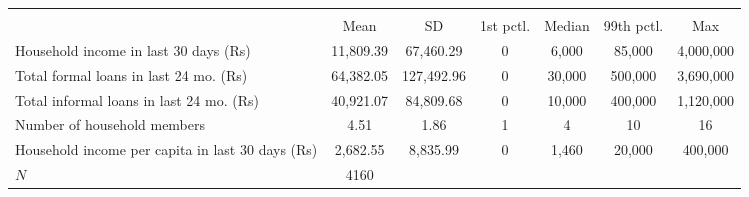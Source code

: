 {
\def\sym#1{\ifmmode^{#1}\else\(^{#1}\)\fi}
\begin{tabular}{l*{1}{cccccc}}
\hline\hline
            &\multicolumn{6}{c}{}                                                         \\
            &        Mean&          SD&   1st pctl.&      Median&  99th pctl.&         Max\\
\hline
Household income in last 30 days (Rs)&   11,809.39&   67,460.29&           0&       6,000&      85,000&   4,000,000\\
Total formal loans in last 24 mo. (Rs)&   64,382.05&  127,492.96&           0&      30,000&     500,000&   3,690,000\\
Total informal loans in last 24 mo. (Rs)&   40,921.07&   84,809.68&           0&      10,000&     400,000&   1,120,000\\
Number of household members&        4.51&        1.86&           1&           4&          10&          16\\
Household income per capita in last 30 days (Rs)&    2,682.55&    8,835.99&           0&       1,460&      20,000&     400,000\\
\hline
\(N\)       &        4160&            &            &            &            &            \\
\hline\hline
\end{tabular}
}
